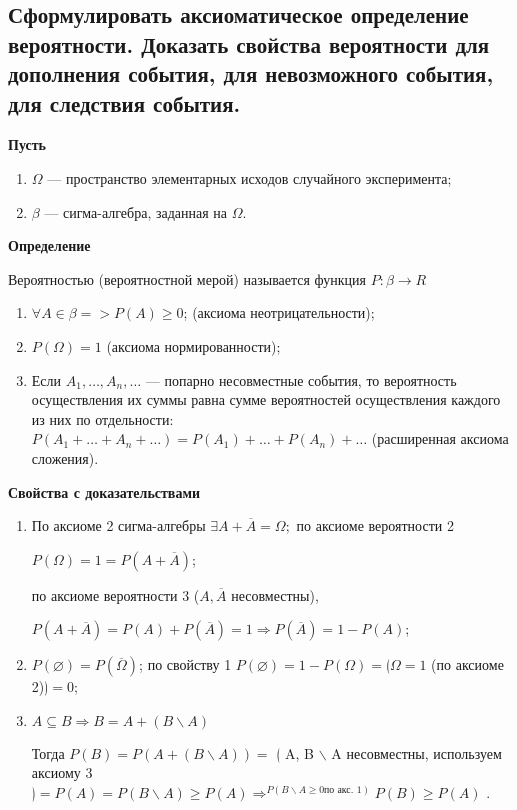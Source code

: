 \subsection{Сформулировать аксиоматическое определение вероятности. Доказать свойства вероятности для дополнения события, для невозможного события, для следствия события.}


\textbf{Пусть} 

\begin{enumerate}
	\item $\Omega$ --- пространство элементарных исходов случайного эксперимента;
	\item $\beta$ --- сигма-алгебра, заданная на $\Omega$.
\end{enumerate}

\textbf{Определение}

Вероятностью (вероятностной мерой) называется функция $P: \beta \rightarrow R$

\begin{enumerate}
	\item $\forall A \in \beta => P(A) \geqslant 0$; (аксиома неотрицательности);
	\item $P(\Omega) = 1$ (аксиома нормированности);
	\item Если $A_1, \dots, A_n, \dots$ --- попарно несовместные события, то вероятность осуществления их суммы равна сумме вероятностей осуществления каждого из них по отдельности: $P(A_1 + \dots + A_n + \dots) = P(A_1) + \dots + P(A_n) + \dots$ (расширенная аксиома сложения). 
\end{enumerate}

\textbf{Свойства с доказательствами}

\begin{enumerate}
	\item По аксиоме 2 сигма-алгебры $\exists A + \overline{A} = \Omega; $ по аксиоме вероятности 2 
	
	$P(\Omega) = 1 = P(A + \overline{A})$; 
	
	по аксиоме вероятности 3 ($A, \overline{A}$ несовместны), 
	
	$P(A + \overline{A}) = P(A) + P(\overline{A}) = 1 \Rightarrow P(\overline{A}) = 1 - P(A)$;
	
	\item $P(\varnothing) = P(\overline{\Omega})$; по свойству 1 $P(\varnothing) = 1 - P(\Omega) = \lgroup \Omega=1$ (по аксиоме 2)$\rgroup = 0$;
	
	\item $A \subseteq B \Rightarrow B = A + (B \backslash A)$ 
	
	Тогда $P(B) = P(A + (B \backslash A)) =$ $\lgroup$ A, B $\backslash$ A несовместны, используем аксиому 3$\rgroup = P(A) = P(B \backslash A) \geqslant P(A) \Rightarrow^{{P(B\backslash A \geqslant 0 \text{по акс. 1})}} P(B) \geqslant P(A)$ .

\end{enumerate}

